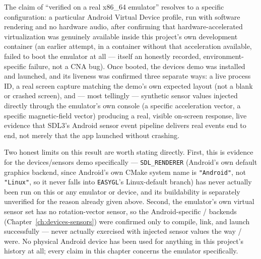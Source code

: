 The claim of ``verified on a real x86\_64 emulator'' resolves to a specific configuration: a
particular Android Virtual Device profile, run with software rendering and no hardware audio,
after confirming that hardware-accelerated virtualization was genuinely available inside this
project's own development container (an earlier attempt, in a container without that
acceleration available, failed to boot the emulator at all --- itself an honestly recorded,
environment-specific failure, not a CNA bug). Once booted, the devices demo was installed and
launched, and its liveness was confirmed three separate ways: a live process ID, a real
screen capture matching the demo's own expected layout (not a blank or crashed screen), and ---
most tellingly --- synthetic sensor values injected directly through the emulator's own
console (a specific acceleration vector, a specific magnetic-field vector) producing a real,
visible on-screen response, live evidence that SDL3's Android sensor event pipeline delivers
real events end to end, not merely that the app launched without crashing.

Two honest limits on this result are worth stating directly. First, this is evidence for the
devices/sensors demo specifically --- \texttt{SDL\_RENDERER} (Android's own default graphics
backend, since Android's own CMake system name is \texttt{"Android"}, not \texttt{"Linux"},
so it never falls into \texttt{EASYGL}'s Linux-default branch) has never actually been run on
this or any emulator or device, and its buildability is separately unverified for the reason
already given above. Second, the emulator's own virtual sensor set has no rotation-vector
sensor, so the Android-specific / backends
(Chapter~\ref{ch:devices-sensors}) were confirmed only to compile, link, and launch
successfully --- never actually exercised with injected sensor values the way
/ were. No physical Android device has been used
for anything in this project's history at all; every claim in this chapter concerns the
emulator specifically.
